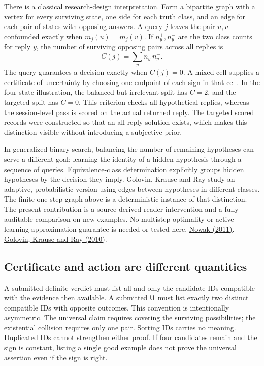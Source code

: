 \documentclass[12pt,letterpaper]{article}
\begin{document}
There is a classical research-design interpretation. Form a bipartite graph with a vertex for every surviving state, one side for each truth class, and an edge for each pair of states with opposing answers. A query $j$ leaves the pair $u,v$ confounded exactly when $m_j(u)=m_j(v)$. If $n^+_y,n^-_y$ are the two class counts for reply $y$, the number of surviving opposing pairs across all replies is
\[
    C(j)=\sum_{y}n^+_y n^-_y.
\]
The query guarantees a decision exactly when $C(j)=0$. A mixed cell supplies a certificate of uncertainty by choosing one endpoint of each sign in that cell. In the four-state illustration, the balanced but irrelevant split has $C=2$, and the targeted split has $C=0$. This criterion checks all hypothetical replies, whereas the session-level pass is scored on the actual returned reply. The targeted scored records were constructed so that an all-reply solution exists, which makes this distinction visible without introducing a subjective prior.

In generalized binary search, balancing the number of remaining hypotheses can serve a different goal: learning the identity of a hidden hypothesis through a sequence of queries. Equivalence-class determination explicitly groups hidden hypotheses by the decision they imply. Golovin, Krause and Ray study an adaptive, probabilistic version using edges between hypotheses in different classes. The finite one-step graph above is a deterministic instance of that distinction. The present contribution is a source-derived reader intervention and a fully auditable comparison on new examples. No multistep optimality or active-learning approximation guarantee is needed or tested here. \href{https://doi.org/10.1109/TIT.2011.2169298}{Nowak (2011)}. \href{https://proceedings.neurips.cc/paper/2010/file/1e6e0a04d20f50967c64dac2d639a577-Paper.pdf}{Golovin, Krause and Ray (2010)}.

\subsection{Certificate and action are different quantities}
A submitted definite verdict must list all and only the candidate IDs compatible with the evidence then available. A submitted $\mathsf U$ must list exactly two distinct compatible IDs with opposite outcomes. This convention is intentionally asymmetric. The universal claim requires covering the surviving possibilities; the existential collision requires only one pair. Sorting IDs carries no meaning. Duplicated IDs cannot strengthen either proof. If four candidates remain and the sign is constant, listing a single good example does not prove the universal assertion even if the sign is right.
\end{document}
